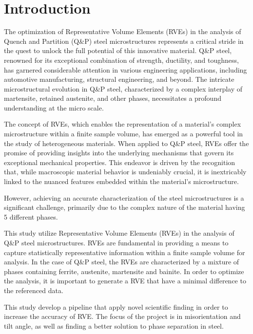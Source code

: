 
\chapter{Introduction} %

The optimization of Representative Volume Elements (RVEs) in the analysis of Quench and Partition (Q\&P) steel microstructures represents a critical stride in the quest to unlock the full potential of this innovative material. Q\&P steel, renowned for its exceptional combination of strength, ductility, and toughness, has garnered considerable attention in various engineering applications, including automotive manufacturing, structural engineering, and beyond. The intricate microstructural evolution in Q\&P steel, characterized by a complex interplay of martensite, retained austenite, and other phases, necessitates a profound understanding at the micro scale.

The concept of RVEs, which enables the representation of a material's complex microstructure within a finite sample volume, has emerged as a powerful tool in the study of heterogeneous materials. When applied to Q\&P steel, RVEs offer the promise of providing insights into the underlying mechanisms that govern its exceptional mechanical properties. This endeavor is driven by the recognition that, while macroscopic material behavior is undeniably crucial, it is inextricably linked to the nuanced features embedded within the material's microstructure.

However, achieving an accurate characterization of the steel microstructures is a significant challenge, primarily due to the complex nature of the material having 5 different phases.

This study utilize Representative Volume Elements (RVEs) in the analysis of Q\&P steel microstructures. RVEs are fundamental in providing a means to capture statistically representative information within a finite sample volume for analysis. In the case of Q\&P steel, the RVEs are characterized by a mixture of phases containing ferrite, austenite, martensite and bainite. In order to optimize the analysis, it is important to generate a RVE that have a minimal difference to the referenced data.

This study develop a pipeline that apply novel scientific finding in order to increase the accuracy of RVE. The focus of the project is in misorientation and tilt angle, as well as finding a better solution to phase separation in steel.
  
